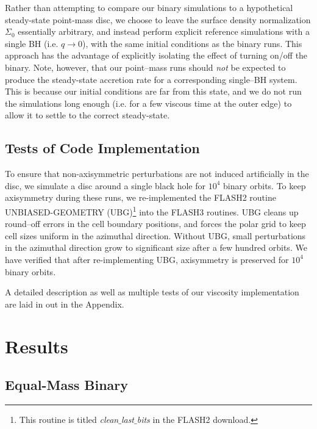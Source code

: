 Rather than attempting to compare our binary simulations to a
hypothetical steady-state point-mass disc, we choose to leave the
surface density normalization $\Sigma_0$ essentially arbitrary, and
instead perform explicit reference simulations with a single BH
(i.e. $q \rightarrow 0$), with the same initial conditions as the binary runs.
This approach has the advantage of explicitly isolating the effect of
turning on/off the binary.  Note, however, that our point--mass runs
should {\em not} be expected to produce the steady-state accretion rate
for a corresponding single--BH system. This is because our initial
conditions are far from this state, and we do not run the simulations
long enough (i.e. for a few viscous time at the outer edge) to allow
it to settle to the correct steady-state.



\subsection{Tests of Code Implementation}
\label{Tests of Code Implementation}

To ensure that non-axisymmetric perturbations are not induced
artificially in the disc, we simulate a disc around a single black hole for $10^4$ binary orbits.  To
keep axisymmetry during these runs, we re-implemented the FLASH2
routine UNBIASED-GEOMETRY (UBG)\footnote{This routine is titled {\em
    clean$\_$last$\_$bits} in the FLASH2 download.} into the FLASH3
routines.  UBG cleans up round--off errors in the cell boundary
positions, and forces the polar grid to keep cell sizes uniform in the
azimuthal direction. Without UBG, small perturbations in the azimuthal
direction grow to significant size after a few hundred orbits. We have
verified that after re-implementing UBG, axisymmetry is preserved for
$10^4$ binary orbits.   

A detailed description as well as multiple tests of our viscosity implementation are laid in out in the Appendix.






\section{Results}
\label{Results}

\subsection{Equal-Mass Binary}
\label{Equal Mass Binary}

